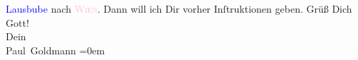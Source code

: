                   \textcolor{blue}{Lausbube}{} nach \textsc{\textcolor{pink}{Wien}{}\ledrightnote{\textcolor{pink}{Wien}}}.  Dann will ich Dir vorher Inſtruktionen
               geben.\pend
           \pstart
           Grüß Dich Gott! {\\[\baselineskip]}Dein {\\[\baselineskip]}\spacefill\mbox{Paul Goldmann}\pend
           \leftskip=0em{}\endnumbering{}\begin{anhang}\end{anhang}
      